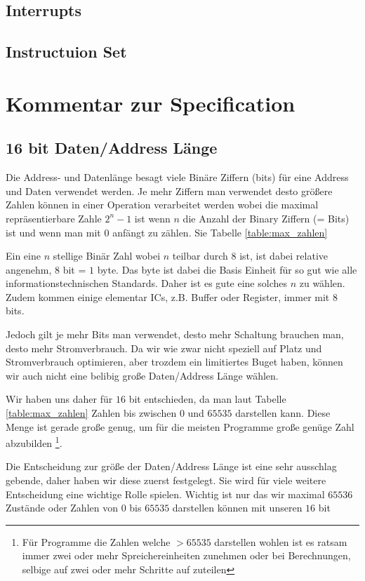 \documentclass{scrartcl}
\begin{document}
\subsection{\label{section:interrupts}Interrupts}

\subsection{\label{section:insSet}Instructuion Set}

\section{Kommentar zur Specification}

\subsection{16 bit Daten/Address Länge}
Die Address- und Datenlänge besagt viele Binäre Ziffern (bits) für eine Address und Daten verwendet werden. Je mehr Ziffern man verwendet desto größere Zahlen können in einer Operation verarbeitet werden wobei die maximal repräsentierbare Zahle $2^n - 1$ ist wenn $n$ die Anzahl der Binary Ziffern (= Bits) ist und wenn man mit $0$ anfängt zu zählen. Sie Tabelle \ref{table:max_zahlen}

Ein eine $n$ stellige Binär Zahl wobei $n$ teilbar durch $8$ ist, ist dabei relative angenehm, $8$ bit = $1$ byte. Das byte ist dabei die Basis Einheit für so gut wie alle informationstechnischen Standards. Daher ist es gute eine solches $n$ zu wählen.
Zudem kommen einige elementar ICs, z.B. Buffer oder Register, immer mit 8 bits.

Jedoch gilt je mehr Bits man verwendet, desto mehr Schaltung brauchen man, desto mehr Stromverbrauch. Da wir wie zwar nicht speziell auf Platz und Stromverbrauch optimieren, aber trozdem ein limitiertes Buget haben, können wir auch nicht eine belibig große Daten/Address Länge wählen.

Wir haben uns daher für $16$ bit entschieden, da man laut Tabelle \ref{table:max_zahlen} Zahlen bis zwischen $0$ und $65535$ darstellen kann. Diese Menge ist gerade große genug, um für die meisten Programme große genüge Zahl abzubilden
\footnote{Für Programme die Zahlen welche $> 65535$ darstellen wohlen ist es ratsam immer zwei oder mehr Spreichereinheiten zunehmen oder bei Berechnungen, selbige auf zwei oder mehr Schritte auf zuteilen}.

Die Entscheidung zur größe der Daten/Address Länge ist eine sehr ausschlag gebende, daher haben wir diese zuerst festgelegt. Sie wird für viele weitere Entscheidung eine wichtige Rolle spielen. Wichtig ist nur das wir maximal $65536$ Zustände oder Zahlen von $0$ bis $65535$ darstellen können mit unseren $16$ bit
\end{document}
